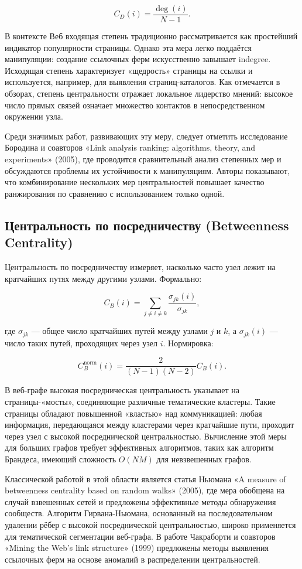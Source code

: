 \documentclass[12pt, a4paper]{article}
\begin{document}
\[
C_D(i) = \frac{\deg(i)}{N-1}.
\]

В контексте Веб входящая степень традиционно рассматривается как простейший индикатор популярности страницы. Однако эта мера легко поддаётся манипуляции: создание ссылочных ферм искусственно завышает indegree. Исходящая степень характеризует «щедрость» страницы на ссылки и используется, например, для выявления страниц-каталогов. Как отмечается в обзорах, степень центральности отражает локальное лидерство мнений: высокое число прямых связей означает множество контактов в непосредственном окружении узла.

Среди значимых работ, развивающих эту меру, следует отметить исследование Бородина и соавторов «Link analysis ranking: algorithms, theory, and experiments» (2005), где проводится сравнительный анализ степенных мер и обсуждаются проблемы их устойчивости к манипуляциям. Авторы показывают, что комбинирование нескольких мер центральностей повышает качество ранжирования по сравнению с использованием только одной.

\subsection{Центральность по посредничеству (Betweenness Centrality)}

Центральность по посредничеству измеряет, насколько часто узел лежит на кратчайших путях между другими узлами. Формально:

\[
C_B(i) = \sum_{j \neq i \neq k} \frac{\sigma_{jk}(i)}{\sigma_{jk}},
\]

где $\sigma_{jk}$ — общее число кратчайших путей между узлами $j$ и $k$, а $\sigma_{jk}(i)$ — число таких путей, проходящих через узел $i$. Нормировка:

\[
C_B^{\text{norm}}(i) = \frac{2}{(N-1)(N-2)} C_B(i).
\]

В веб-графе высокая посредническая центральность указывает на страницы-«мосты», соединяющие различные тематические кластеры. Такие страницы обладают повышенной «властью» над коммуникацией: любая информация, передающаяся между кластерами через кратчайшие пути, проходит через узел с высокой посреднической центральностью. Вычисление этой меры для больших графов требует эффективных алгоритмов, таких как алгоритм Брандеса, имеющий сложность $O(NM)$ для невзвешенных графов.

Классической работой в этой области является статья Ньюмана «A measure of betweenness centrality based on random walks» (2005), где мера обобщена на случай взвешенных сетей и предложены эффективные методы обнаружения сообществ. Алгоритм Гирвана-Ньюмана, основанный на последовательном удалении рёбер с высокой посреднической центральностью, широко применяется для тематической сегментации веб-графа. В работе Чакраборти и соавторов «Mining the Web's link structure» (1999) предложены методы выявления ссылочных ферм на основе аномалий в распределении центральностей.
\end{document}

